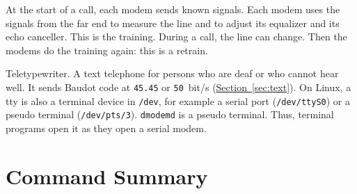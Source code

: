\documentclass[a5paper,10pt]{article}
\newcommand{\std}[1]{\texttt{#1}}
\newcommand{\stdb}[1]{\textpdfrender{TextRenderingMode=FillStroke,
  LineWidth=0.25pt}{\texttt{#1}}}
\begin{document}
\begin{description}[style=nextline,leftmargin=1.2em,font=\bfseries\color{dmnavy}]
\item[Training and retrain] At the start of a call, each modem sends
  known signals.  Each modem uses the signals from the far end to measure
  the line and to adjust its equalizer and its echo canceller.  This is
  the training.  During a call, the line can change.  Then the modems do the
  training again: this is a retrain.
\item[\stdb{TTY}] Teletypewriter.  A text telephone for persons who are
  deaf or who cannot hear well.  It sends Baudot code at \std{45.45} or
  \std{50}~bit/s (\hyperref[sec:text]{Section~\ref*{sec:text}}).
  On Linux, a tty is also a terminal device in \texttt{/dev}, for
  example a serial port (\texttt{/dev/ttyS0}) or a pseudo terminal
  (\texttt{/dev/pts/3}).  \texttt{dmodemd} is a pseudo terminal.  Thus,
  terminal programs open it as they open a serial modem.
\end{description}

\section{Command Summary}
\end{document}
